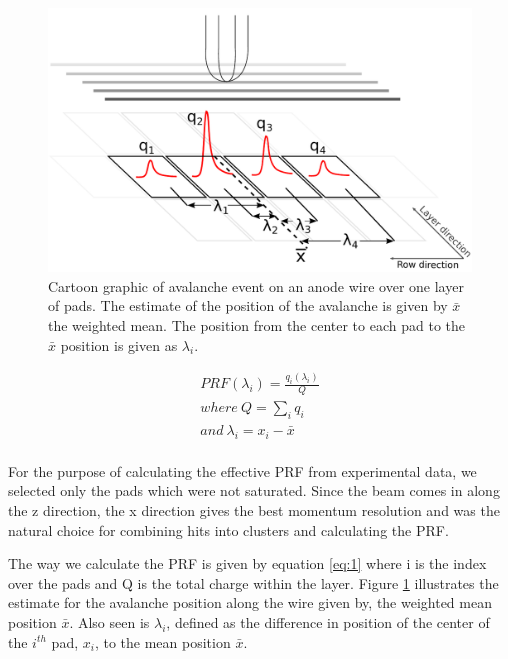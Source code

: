 \documentclass[review]{elsarticle}
\begin{document}
\begin{figure}[H]
\includegraphics[width=\linewidth]{defofavalanche}
\caption{Cartoon graphic of avalanche event on an anode wire over one layer of pads. The estimate of the position of the avalanche is given by $\bar{x}$  the weighted mean. The position from the center to each pad to the $\bar{x}$ position is given as $\lambda_i$.}
\label{fig:av}
\end{figure}

\begin{equation}\label{eq:1}
\begin{split}
PRF(\lambda_i) = \frac{q_i(\lambda_i)}{Q}\\
where \ Q=\sum_i q_i\\
and \   \lambda_i=x_i-\bar{x}\\
\end{split}
\end{equation}

For the purpose of calculating the effective PRF from experimental data, we selected only the pads which were not saturated. Since the beam comes in along the z direction, the x direction gives the best momentum resolution and was the natural choice for combining hits into clusters and calculating the PRF. 

The way we calculate the PRF is given by equation \ref{eq:1} where i is the index over the pads and Q is the total charge within the layer. Figure \ref{fig:av}  illustrates the estimate for the avalanche position along the wire given by, the weighted mean position $\bar{x}$. Also seen is $\lambda_i$, defined as the difference in position of the center of the $i^{th}$ pad, $x_i$, to the mean position $\bar{x}$. 
\end{document}
